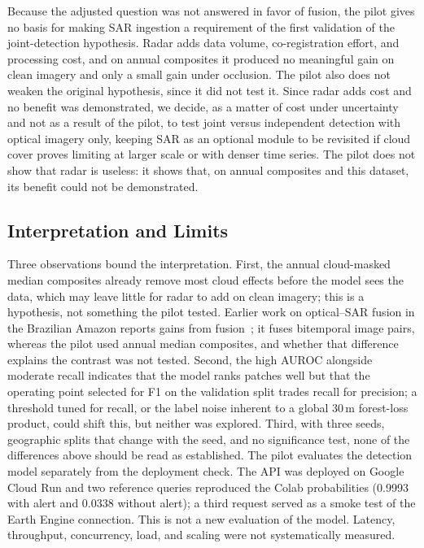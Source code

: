 \documentclass{article}
\begin{document}
Because the adjusted question was not answered in favor of fusion, the
pilot gives no basis for making SAR ingestion a requirement of the first
validation of the joint-detection hypothesis.
Radar adds data volume, co-registration effort, and processing cost, and on
annual composites it produced no meaningful gain on clean imagery and only a
small gain under occlusion.
The pilot also does not weaken the original hypothesis, since it did not
test it.
Since radar adds cost and no benefit was demonstrated, we decide, as a matter
of cost under uncertainty and not as a result of the pilot, to test joint
versus independent detection with optical imagery only, keeping SAR as an
optional module to be revisited if cloud cover proves limiting at larger scale
or with denser time series.
The pilot does not show that radar is useless: it shows that, on annual
composites and this dataset, its benefit could not be demonstrated.

\subsection{Interpretation and Limits}

Three observations bound the interpretation.
First, the annual cloud-masked median composites already remove most cloud
effects before the model sees the data, which may leave little for radar to
add on clean imagery; this is a hypothesis, not something the pilot tested.
Earlier work on optical--SAR fusion in the Brazilian Amazon reports gains from
fusion~\cite{ferrari2023}; it fuses bitemporal image pairs, whereas the pilot
used annual median composites, and whether that difference explains the
contrast was not tested.
Second, the high AUROC alongside moderate recall indicates that the model ranks
patches well but that the operating point selected for F1 on the validation
split trades recall for precision; a threshold tuned for recall, or the
label noise inherent to a global 30\,m forest-loss product, could shift this,
but neither was explored.
Third, with three seeds, geographic splits that change with the seed, and no
significance test, none of the differences above should be read as established.
The pilot evaluates the detection model separately from the deployment check. The API was deployed on Google Cloud Run and two reference queries reproduced the Colab probabilities (0.9993 with alert and 0.0338 without alert); a third request served as a smoke test of the Earth Engine connection. This is not a new evaluation of the model. Latency, throughput, concurrency, load, and scaling were not systematically measured.
\end{document}
